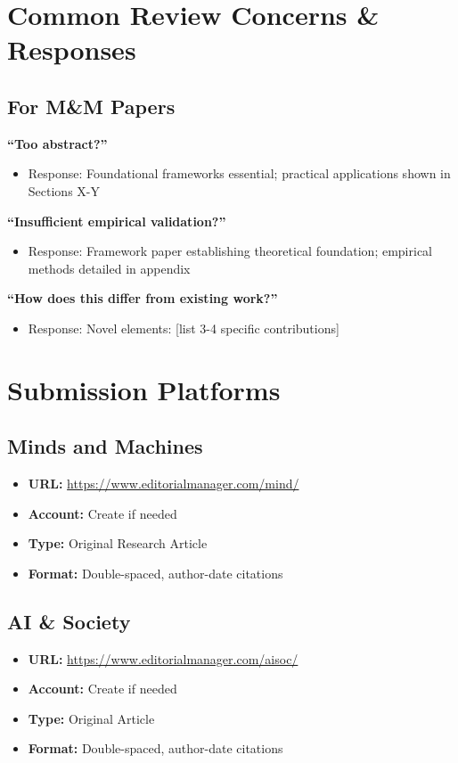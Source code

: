 \documentclass[12pt]{article}
\begin{document}
\section*{Common Review Concerns \& Responses}

\subsection*{For M\&M Papers}

\textbf{``Too abstract?''}
\begin{itemize}[itemsep=0pt]
\item Response: Foundational frameworks essential; practical applications shown in Sections X-Y
\end{itemize}

\textbf{``Insufficient empirical validation?''}
\begin{itemize}[itemsep=0pt]
\item Response: Framework paper establishing theoretical foundation; empirical methods detailed in appendix
\end{itemize}

\textbf{``How does this differ from existing work?''}
\begin{itemize}[itemsep=0pt]
\item Response: Novel elements: [list 3-4 specific contributions]
\end{itemize}

\section*{Submission Platforms}

\subsection*{Minds and Machines}
\begin{itemize}[itemsep=0pt]
\item \textbf{URL:} \url{https://www.editorialmanager.com/mind/}
\item \textbf{Account:} Create if needed
\item \textbf{Type:} Original Research Article
\item \textbf{Format:} Double-spaced, author-date citations
\end{itemize}

\subsection*{AI \& Society}
\begin{itemize}[itemsep=0pt]
\item \textbf{URL:} \url{https://www.editorialmanager.com/aisoc/}
\item \textbf{Account:} Create if needed
\item \textbf{Type:} Original Article
\item \textbf{Format:} Double-spaced, author-date citations
\end{itemize}
\end{document}
